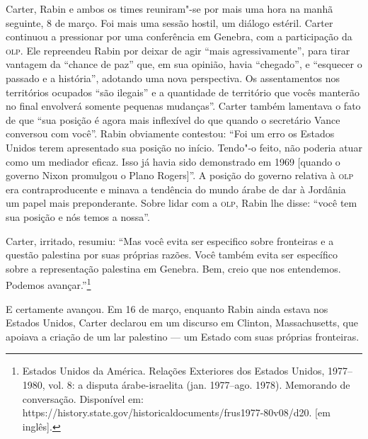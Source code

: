 Carter, Rabin e ambos os times reuniram"-se por mais uma hora na manhã
seguinte, 8 de março. Foi mais uma sessão hostil, um diálogo estéril.
Carter continuou a pressionar por uma conferência em Genebra, com a
participação da \textsc{olp}. Ele repreendeu Rabin por deixar de agir ``mais
agressivamente'', para tirar vantagem da ``chance de paz'' que, em sua
opinião, havia ``chegado'', e ``esquecer o passado e a história'',
adotando uma nova perspectiva. Os assentamentos nos territórios ocupados
``são ilegais'' e a quantidade de território que vocês manterão no final
envolverá somente pequenas mudanças''. Carter também lamentava o fato de
que ``sua posição é agora mais inflexível do que quando o secretário Vance
conversou com você''. Rabin obviamente contestou: ``Foi um erro os
Estados Unidos terem apresentado sua posição no início. Tendo"-o feito,
não poderia atuar como um mediador eficaz. Isso já havia sido
demonstrado em 1969 {[}quando o governo Nixon promulgou o Plano Rogers{]}''.
A posição do governo relativa à \textsc{olp} era contraproducente e minava a
tendência do mundo árabe de dar à Jordânia um papel mais preponderante.
Sobre lidar com a \textsc{olp}, Rabin lhe disse: ``você tem sua posição e nós
temos a nossa''.

Carter, irritado, resumiu: ``Mas você evita ser especifico sobre
fronteiras e a questão palestina por suas próprias razões. Você também
evita ser específico sobre a representação palestina em Genebra. Bem,
creio que nos entendemos. Podemos avançar.''\footnote{Estados Unidos da América. Relações Exteriores dos Estados Unidos, 1977--1980, vol. 8: a disputa árabe-israelita (jan. 1977--ago. 1978). Memorando de conversação. Disponível em: https://history.state.gov/historicaldocuments/frus1977-80v08/d20. {[}em inglês{]}.}

E certamente avançou. Em 16 de março, enquanto Rabin ainda estava nos
Estados Unidos, Carter declarou em um discurso em Clinton,
Massachusetts, que apoiava a criação de um lar palestino --- um Estado
com suas próprias fronteiras.

